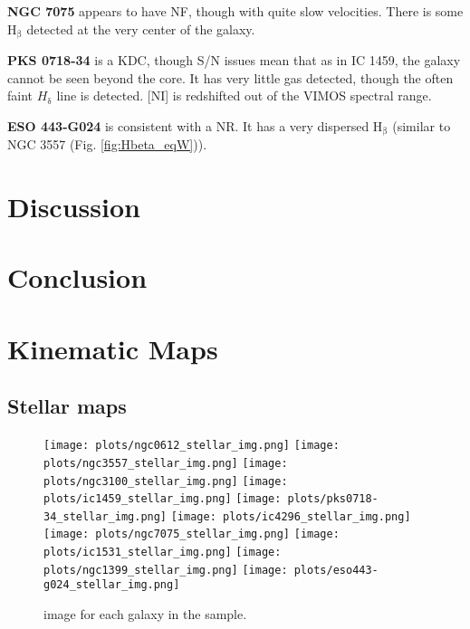 \documentclass[fleqn,usenatbib,useAMS]{mnras}
\begin{document}
	\textbf{NGC 7075} appears to have NF, though with quite slow velocities. There is some H$_\mathrm{\beta}$ detected at the very center of the galaxy. 

	\textbf{PKS 0718-34} is a KDC, though S/N issues mean that as in IC 1459, the galaxy cannot be seen beyond the core. It has very little gas detected, though the often faint $H_\mathrm{\delta}$ line is detected. [NI] is redshifted out of the VIMOS spectral range.

	\textbf{ESO 443-G024} is consistent with a NR. It has a very dispersed H$_\mathrm{\beta}$ (similar to NGC 3557 (Fig. \ref{fig:Hbeta_eqW})).


	


\section{Discussion}
	\label{sec:discuss}

\section{Conclusion}
	\label{sec:conc}




{}

\appendix

\section{Kinematic Maps}
	\label{sec:kinmaps}
    \subsection{Stellar maps}
        \label{subsec:stellarmaps}
        \begin{figure*}
            \centering
            \texttt{[image: plots/ngc0612\_stellar\_img.png]}
            \texttt{[image: plots/ngc3557\_stellar\_img.png]}
            \texttt{[image: plots/ngc3100\_stellar\_img.png]}
            \texttt{[image: plots/ic1459\_stellar\_img.png]}
            \texttt{[image: plots/pks0718-34\_stellar\_img.png]}
            \texttt{[image: plots/ic4296\_stellar\_img.png]}
            \texttt{[image: plots/ngc7075\_stellar\_img.png]}
            \texttt{[image: plots/ic1531\_stellar\_img.png]}
            \texttt{[image: plots/ngc1399\_stellar\_img.png]}
            \texttt{[image: plots/eso443-g024\_stellar\_img.png]}
            \caption{ image for each galaxy in the sample.}
            \label{fig:stellar_img}
        \end{figure*}
\end{document}
